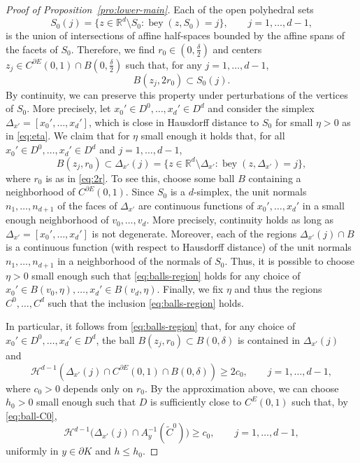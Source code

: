 \documentclass[12pt]{article}
\newcommand{\IR}{\mathds{R}}
\DeclareMathOperator{\bey}{bey}
\def\cH{{\mathcal H}}
\theoremstyle{definition}
\begin{document}
\begin{proof}[Proof of Proposition~\ref{pro:lower-main}]
Each of the open polyhedral sets 
\[
S_0(j)=\{z\in \IR^d\setminus S_0\colon \bey(z,S_0)=j\},\qquad j=1,\dots,d-1,
\]
is the union of intersections of affine half-spaces bounded by the affine spans of the facets of $S_0$. Therefore, we find $r_0\in (0,\frac{\delta}{2})$ and centers $z_j\in C^{\partial E}(0,1)\cap B(0,\frac{\delta}{2})$ such that, for any $j=1,\dots,d-1$,
\begin{equation} \label{eq:2r}
B(z_j,2r_0)\subset S_0(j).
\end{equation}
By continuity, we can preserve this property under perturbations of the vertices of $S_0$. More precisely, let $x_0'\in D^0,\dots,x_d'\in D^d$ and consider the simplex $ \Delta_{x'}=[x_0',\dots,x_d']$, which is close in Hausdorff distance to $S_0$ for small $\eta>0$ as in \eqref{eq:eta}. We claim that for $\eta$ small enough it holds that, for all $x_0'\in D^0,\dots,x_d'\in D^d$ and $j=1,\dots,d-1$,
\begin{equation} \label{eq:balls-region}
	B(z_j,r_0)\subset \Delta_{x'}(j)=\{z\in \IR^d\setminus \Delta_{x'}\colon  \bey(z,\Delta_{x'})=j\},
\end{equation}
where $r_0$ is as in \eqref{eq:2r}. To see this, choose some ball $B$ containing a neighborhood of $C^{\partial E}(0,1)$.
Since $S_0$ is a $d$-simplex, the unit normals $n_1,\dots,n_{d+1}$ of the faces of $\Delta_{x'}$ are continuous functions of $x_0',\dots,x_d'$ in a small enough neighborhood of $v_0,\dots,v_d$. More precisely, continuity holds as long as $ \Delta_{x'}=[x_0',\dots,x_d']$ is not degenerate. Moreover, each of the regions $\Delta_{x'}(j)\cap B$ is a continuous function (with respect to Hausdorff distance) of the unit normals $n_1,\dots,n_{d+1}$ in a neighborhood of the normals of $S_0$. Thus, it is possible to choose $\eta>0$ small enough such that \eqref{eq:balls-region} holds for any choice of $x_0'\in B(v_0,\eta),\dots,x_d'\in B(v_d,\eta)$. Finally, we fix $\eta$ and thus the regions $C^0,\dots,C^d$ such that the inclusion \eqref{eq:balls-region} holds.

In particular, it follows from \eqref{eq:balls-region} that, for any choice of $x_0'\in D^0,\dots,x_d'\in D^d$, the ball $B(z_j,r_0)\subset B(0,\delta)$ is contained in $\Delta_{x'}(j)$ and 
\[
\cH^{d-1}(\Delta_{x'}(j)\cap C^{\partial E}(0,1)\cap B(0,\delta))\ge 2c_0,\qquad j=1,\dots,d-1,
\]
where $c_0>0$ depends only on $r_0$. By the approximation above, we can choose $h_0>0$ small enough such that $D$ is sufficiently close to $C^{E}(0,1)$ such that, by \eqref{eq:ball-C0}, 
\begin{equation} \label{eq:region-lower}
\cH^{d-1}\big(\Delta_{x'}(j)\cap A_y^{-1}(\tilde{C}^0)\big)
\ge c_0,\qquad j=1,\dots,d-1,
\end{equation}
uniformly in $y\in \partial K$ and $h\le h_0$. 


\end{proof}
\end{document}
